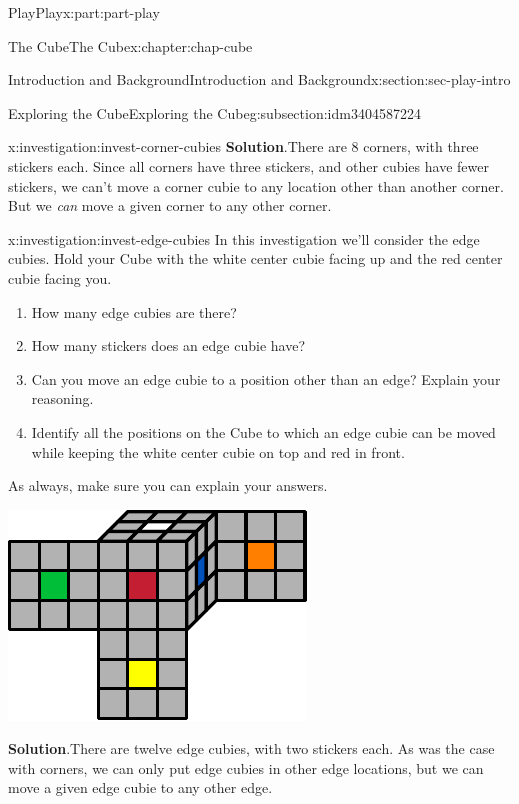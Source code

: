 \documentclass[oneside,10pt,]{book}
\newcommand{\blocktitlefont}{\relax}
\numberwithin{equation}{section}
\begin{document}
\begin{partptx}{Play}{}{Play}{}{}{x:part:part-play}
\begin{chapterptx}{The Cube}{}{The Cube}{}{}{x:chapter:chap-cube}
\begin{sectionptx}{Introduction and Background}{}{Introduction and Background}{}{}{x:section:sec-play-intro}
\begin{subsectionptx}{Exploring the Cube}{}{Exploring the Cube}{}{}{g:subsection:idm3404587224}
\begin{investigation}{}{x:investigation:invest-corner-cubies}
\noindent\textbf{\blocktitlefont Solution}.\hypertarget{g:solution:idm3404577592}{}\quad{}There are 8 corners, with three stickers each. Since all corners have three stickers, and other cubies have fewer stickers, we can't move a corner cubie to any location other than another corner. But we \emph{can} move a given corner to any other corner.\end{investigation}%
\begin{investigation}{}{x:investigation:invest-edge-cubies}%
In this investigation we'll consider the edge cubies. Hold your Cube with the white center cubie facing up and the red center cubie facing you.%
\begin{enumerate}
\item{}How many edge cubies are there?%
\item{}How many stickers does an edge cubie have?%
\item{}Can you move an edge cubie to a position other than an edge? Explain your reasoning.%
\item{}Identify all the positions on the Cube to which an edge cubie can be moved while keeping the white center cubie on top and red in front.%
\end{enumerate}
As always, make sure you can explain your answers.%
\begin{image}{0.25}{0.5}{0.25}%
\includegraphics[width=\linewidth]{./images/moving_cubies.pdf}
\end{image}%
\par\smallskip%
\noindent\textbf{\blocktitlefont Solution}.\hypertarget{g:solution:idm3404572936}{}\quad{}There are twelve edge cubies, with two stickers each. As was the case with corners, we can only put edge cubies in other edge locations, but we can move a given edge cubie to any other edge.\end{investigation}%

\end{subsectionptx}
\end{sectionptx}
\end{chapterptx}
\end{partptx}
\end{document}

